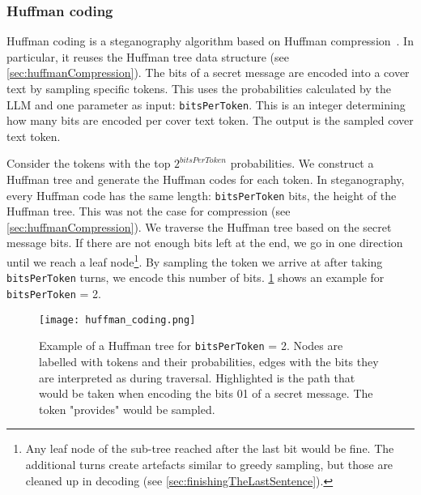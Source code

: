 \subsubsection{Huffman coding}
\label{sec:huffmanCoding}
Huffman coding is a steganography algorithm based on Huffman compression~\cite{zieglerNeuralLinguisticSteganography2019,yangRNNStegaLinguisticSteganography2019}. In particular, it reuses the Huffman tree data structure (see \cref{sec:huffmanCompression}). The bits of a secret message are encoded into a cover text by sampling specific tokens. This uses the probabilities calculated by the \gls{LLM} and one parameter as input: \lstinline|bitsPerToken|. This is an integer determining how many bits are encoded per cover text token. The output is the sampled cover text token.

Consider the tokens with the top $ 2^{bitsPerToken} $ probabilities. We construct a Huffman tree and generate the Huffman codes for each token. In steganography, every Huffman code has the same length: \lstinline|bitsPerToken| bits, the height of the Huffman tree. This was not the case for compression (see \cref{sec:huffmanCompression}). We traverse the Huffman tree based on the secret message bits. If there are not enough bits left at the end, we go in one direction until we reach a leaf node\footnote{Any leaf node of the sub-tree reached after the last bit would be fine. The additional turns create artefacts similar to greedy sampling, but those are cleaned up in decoding (see \cref{sec:finishingTheLastSentence}).}. By sampling the token we arrive at after taking \lstinline|bitsPerToken| turns, we encode this number of bits. \cref{fig:huffmanCoding} shows an example for \lstinline|bitsPerToken| = 2.

\begin{figure}
    \begin{wide}
        \centering
        \captionsetup{width=\linewidth}
        \texttt{[image: huffman\_coding.png]}
		\caption[Huffman coding]{Example of a Huffman tree for \lstinline|bitsPerToken| = 2. Nodes are labelled with tokens and their probabilities, edges with the bits they are interpreted as during traversal. Highlighted is the path that would be taken when encoding the bits 01 of a secret message. The token "provides" would be sampled.}
        \label{fig:huffmanCoding}
    \end{wide}
\end{figure}

